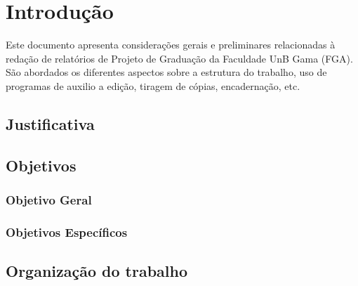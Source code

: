 \chapter[Introdução]{Introdução}


Este documento apresenta considerações gerais e preliminares relacionadas 
à redação de relatórios de Projeto de Graduação da Faculdade UnB Gama 
(FGA). São abordados os diferentes aspectos sobre a estrutura do trabalho, 
uso de programas de auxilio a edição, tiragem de cópias, encadernação, etc.

\section{Justificativa}

\section{Objetivos}

\subsection{Objetivo Geral}

\subsection{Objetivos Específicos}

\section{Organização do trabalho}

